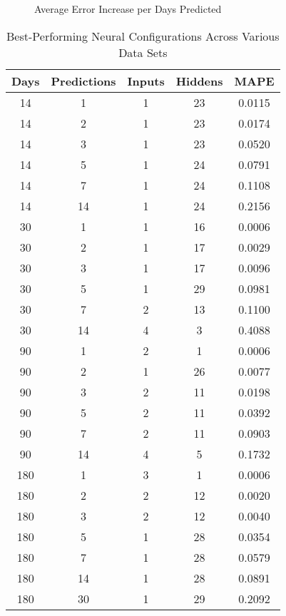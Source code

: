 \documentclass[a4paper,12pt]{article}
\begin{document}
	\begin{figure}[!htbp]
		\centering
		\caption{Average Error Increase per Days Predicted}
		\label{eur_usd_august_30_genetic}
	\end{figure}
	
	\begin{table}[]
		\centering
		\begin{tabular}{@{}cc|cc|c@{}}
			\toprule
			\textbf{Days} & \textbf{Predictions} & \textbf{Inputs} & \textbf{Hiddens} & \textbf{MAPE} \\ \midrule
			14 & 1 & 1 & 23 & 0.0115 \\
			14 & 2 & 1 & 23 & 0.0174 \\
			14 & 3 & 1 & 23 & 0.0520 \\
			14 & 5 & 1 & 24 & 0.0791 \\
			14 & 7 & 1 & 24 & 0.1108 \\
			14 & 14 & 1 & 24 & 0.2156 \\ \midrule
			30 & 1 & 1 & 16 & 0.0006 \\
			30 & 2 & 1 & 17 & 0.0029 \\
			30 & 3 & 1 & 17 & 0.0096 \\
			30 & 5 & 1 & 29 & 0.0981 \\
			30 & 7 & 2 & 13 & 0.1100 \\
			30 & 14 & 4 & 3 & 0.4088 \\ \midrule
			90 & 1 & 2 & 1 & 0.0006 \\
			90 & 2 & 1 & 26 & 0.0077 \\
			90 & 3 & 2 & 11 & 0.0198 \\
			90 & 5 & 2 & 11 & 0.0392 \\
			90 & 7 & 2 & 11 & 0.0903 \\
			90 & 14 & 4 & 5 & 0.1732 \\ \midrule
			180 & 1 & 3 & 1 & 0.0006 \\
			180 & 2 & 2 & 12 & 0.0020 \\
			180 & 3 & 2 & 12 & 0.0040 \\
			180 & 5 & 1 & 28 & 0.0354 \\
			180 & 7 & 1 & 28 & 0.0579 \\
			180 & 14 & 1 & 28 & 0.0891 \\
			180 & 30 & 1 & 29 & 0.2092 \\ \bottomrule
		\end{tabular}
		\caption{Best-Performing Neural Configurations Across Various Data Sets}
		\label{predslope}
	\end{table}
	
\end{document}
